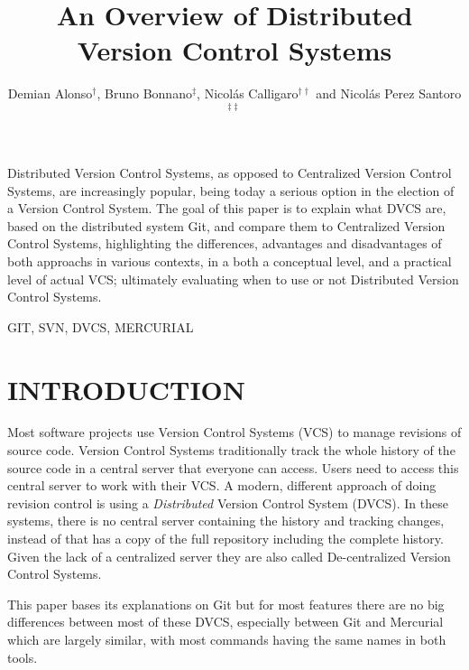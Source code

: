 \documentclass[a4paper,10pt]{article}
\affiliation{
 \dag {\ demianalonso@gmail.com} \\
 \ddag {\ bbonanno@gmail.com} \\
 \dag \dag  {\ nicolascalligaro@gmail.com} \\
 \ddag \ddag  {\ nicolas.perez.santoro@gmail.com }
 }
\begin{document}
\title{An Overview of Distributed Version Control Systems}
\author{Demian Alonso$^{\dag }$, Bruno Bonnano$^{\ddag }$, Nicol\'{a}s Calligaro$^{\dag \dag }$ and Nicol\'{a}s Perez Santoro$^{\ddag \ddag }$}
\maketitle

\abstract
%
%
Distributed Version Control Systems, as opposed to Centralized Version Control Systems, 
are increasingly popular, being today a serious option in the election of a Version
Control System.
The goal of this paper is to explain what DVCS are, based on the distributed system Git, 
and compare them to Centralized Version Control Systems,
highlighting the differences, advantages and disadvantages of both approachs in various 
contexts, in a both a conceptual level, and a practical level of actual VCS; ultimately 
evaluating when to use or not Distributed Version Control Systems. 
\endabstract

\keywords%
GIT, SVN, DVCS, MERCURIAL
\endkeywords

\section{INTRODUCTION}

Most software projects use Version Control Systems (VCS) to manage revisions
of source code. 
Version Control Systems traditionally track the whole history of the
source code in a central server that everyone can access.
Users need to access this central server to work with their VCS.
A modern, different approach of doing revision control is using a \emph{Distributed} Version Control System (DVCS).
In these systems, there is no central server containing the history and tracking changes,
instead of that has a copy of the full repository including the complete history.
Given the lack of a centralized server they are also called De-centralized Version Control Systems. 

This paper bases its explanations on Git but for most features there 
are no big differences between most of these DVCS, especially between Git and Mercurial which are 
largely similar, with most commands having the same names in both tools.
\end{document}
